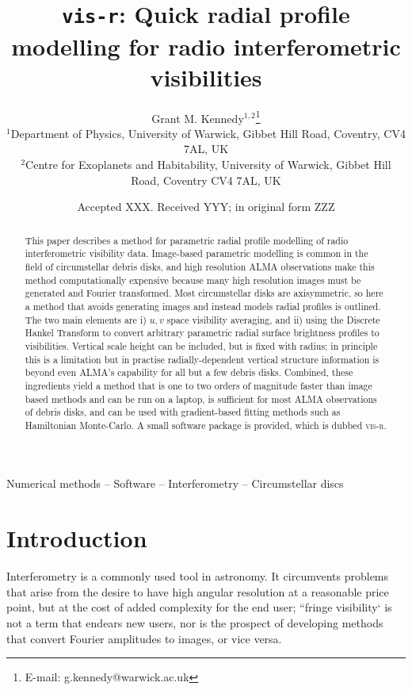 \documentclass[fleqn,usenatbib]{mnras}
\title[vis-r]{\texttt{vis-r}: Quick radial profile modelling for radio interferometric visibilities}
\author[G. M. Kennedy]{
Grant M. Kennedy$^{1,2}$\thanks{E-mail: g.kennedy@warwick.ac.uk}
\\
$^{1}$Department of Physics, University of Warwick, Gibbet Hill Road, Coventry, CV4 7AL, UK\\
$^{2}$Centre for Exoplanets and Habitability, University of Warwick, Gibbet Hill Road, Coventry CV4 7AL, UK\\
}
\date{Accepted XXX. Received YYY; in original form ZZZ}
\begin{document}
\label{firstpage}
\pagerange{\pageref{firstpage}--\pageref{lastpage}}
\maketitle

\begin{abstract}
This paper describes a method for parametric radial profile modelling of radio interferometric visibility data. Image-based parametric modelling is common in the field of circumstellar debris disks, and high resolution ALMA observations make this method computationally expensive because many high resolution images must be generated and Fourier transformed. Most circumstellar disks are axisymmetric, so here a method that avoids generating images and instead models radial profiles is outlined. The two main elements are i) $u,v$ space visibility averaging, and ii) using the Discrete Hankel Transform to convert arbitrary parametric radial surface brightness profiles to visibilities. Vertical scale height can be included, but is fixed with radius; in principle this is a limitation but in practise radially-dependent vertical structure information is beyond even ALMA's capability for all but a few debris disks. Combined, these ingredients yield a method that is one to two orders of magnitude faster than image based methods and can be run on a laptop, is sufficient for most ALMA observations of debris disks, and can be used with gradient-based fitting methods such as Hamiltonian Monte-Carlo. A small software package is provided, which is dubbed \textsc{vis-r}.
\end{abstract}

\begin{keywords}
Numerical methods -- Software -- Interferometry -- Circumstellar discs
\end{keywords}



\section{Introduction}

Interferometry is a commonly used tool in astronomy. It circumvents problems that arise from the desire to have high angular resolution at a reasonable price point, but at the cost of added complexity for the end user; ``fringe visibility` is not a term that endears new users, nor is the prospect of developing methods that convert Fourier amplitudes to images, or vice versa.
\end{document}
